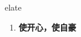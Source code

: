 
\begin{frame}
{\huge elate}
\begin{center}
\begin{enumerate}\Large
  \item \textbf{使开心，使自豪}
\end{enumerate}
\end{center}
\end{frame}
